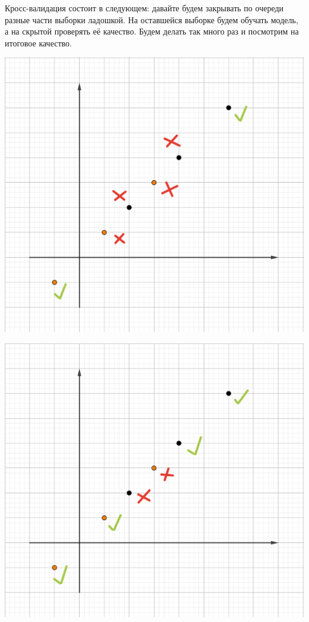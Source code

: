 \documentclass[12pt, a4paper, oneside]{article}
\theoremstyle{plain} %
\theoremstyle{definition}
\begin{document}
\begin{solution}
\begin{enumerate}
	Кросс-валидация состоит в следующем: давайте будем закрывать по очереди разные части выборки ладошкой. На оставшейся выборке будем обучать модель, а на скрытой проверять её качество. Будем делать так много раз и посмотрим на итоговое качество. 
	
	\begin{minipage}[t]{0.45\textwidth}
	    \includegraphics[scale=0.15]{2knn_6.png}
	\end{minipage}
	\hfill
	\begin{minipage}[t]{0.45\textwidth}
	    \includegraphics[scale=0.15]{2knn_7.png}
	\end{minipage}
	

\end{enumerate}
\end{solution}
\end{document}
